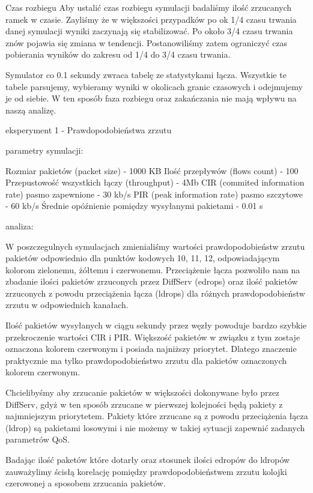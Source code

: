 \documentclass[a4paper]{article}
\begin{document}
Czas rozbiegu
Aby ustalić czas rozbiegu symulacji badaliśmy ilość zrzucanych ramek w czasie. Zayliśmy że w większości przypadków po ok 1/4 czasu trwania danej symulacji wyniki zaczynają się stabilizować. Po około 3/4 czasu trwania znów pojawia się zmiana w tendencji. Postanowiliśmy zatem ograniczyć czas pobierania wyników do zakresu od 1/4 do 3/4 czasu trwania.

Symulator co 0.1 sekundy zwraca tabelę ze statystykami łącza. Wszystkie te tabele parsujemy, wybieramy wyniki w okolicach granic czasowych i odejmujemy je od siebie. W ten sposób faza rozbiegu oraz zakańczania nie mają wpływu na naszą analizę.


eksperyment 1 - Prawdopodobieństwa zrzutu



parametry symulacji:

Rozmiar pakietów (packet size) - 1000 KB
Ilość przepływów (flows count) - 100
Przepustowość wszystkich łączy (throughput) - 4Mb 
CIR (commited information rate) pasmo zapewnione - 30 kb/s
PIR (peak information rate) pasmo szczytowe - 60 kb/s
Średnie opóźnienie pomiędzy wysyłanymi pakietami - 0.01 s

analiza:

W poszczegulnych symulacjach zmienialiśmy wartości prawdopodobieństw zrzutu pakietów odpowiednio dla punktów kodowych 10, 11, 12, odpowiadającym kolorom zielonemu, żółtemu i czerwonemu.
Przeciążenie łącza pozwoliło nam na zbadanie ilości pakietów zrzuconych przez DiffServ (edrops) oraz ilość pakietów zrzuconych z powodu przeciążenia łącza (ldrops) dla różnych prawdopodobieństw zrzutu w odpowiednich kanałach.

Ilość pakietów wysyłanych w ciągu sekundy przez węzły powoduje bardzo szybkie przekroczenie wartości CIR i PIR. Większość pakietów w związku z tym zostaje oznaczona kolorem czerwonym i posiada najniższy priorytet. Dlatego znaczenie praktycznie ma tylko prawdopodobieństwo zrzutu dla pakietów oznaczonych kolorem czerwonym. 

Chcielibyśmy aby zrzucanie pakietów w większości dokonywane było przez DiffServ, gdyż w ten sposób zrzucane w pierwszej kolejności będą pakiety z najmniejszym priorytetem. Pakiety które zrzucane są z powodu przeciążenia łącza (ldrop) są pakietami losowymi i nie możemy w takiej sytuacji zapewnić zadanych parametrów QoS.

Badając ilość paketów które dotarły oraz stosunek ilości edropów do ldropów zauważylimy ścisłą korelację pomiędzy prawdopodobieństwem zrzutu kolojki czerowonej a sposobem zrzucania pakietów.
\end{document}
